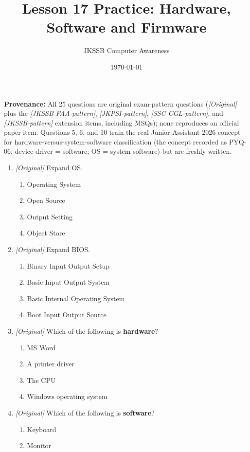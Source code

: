 \documentclass[11pt]{article}
\title{Lesson 17 Practice: Hardware, Software and Firmware}
\author{JKSSB Computer Awareness}
\date{\today}
\begin{document}
\maketitle
\noindent\textbf{Provenance:} All 25 questions are original exam-pattern questions (\textit{[Original]} plus the \textit{[JKSSB FAA-pattern]}, \textit{[JKPSI-pattern]}, \textit{[SSC CGL-pattern]}, and \textit{[JKSSB-pattern]} extension items, including MSQs); none reproduces an official paper item.
Questions 5, 6, and 10 train the real Junior Assistant 2026 concept for
hardware-versus-system-software classification (the concept recorded as PYQ-06,
device driver = software; OS = system software) but are freshly written.

\begin{enumerate}[label=\textbf{Q\arabic*.}, leftmargin=*]
\item \textit{[Original]} Expand OS.
  \begin{enumerate}[label=\Alph*.]
    \item Operating System
    \item Open Source
    \item Output Setting
    \item Object Store
  \end{enumerate}
\item \textit{[Original]} Expand BIOS.
  \begin{enumerate}[label=\Alph*.]
    \item Binary Input Output Setup
    \item Basic Input Output System
    \item Basic Internal Operating System
    \item Boot Input Output Source
  \end{enumerate}
\item \textit{[Original]} Which of the following is \textbf{hardware}?
  \begin{enumerate}[label=\Alph*.]
    \item MS Word
    \item A printer driver
    \item The CPU
    \item Windows operating system
  \end{enumerate}
\item \textit{[Original]} Which of the following is \textbf{software}?
  \begin{enumerate}[label=\Alph*.]
    \item Keyboard
    \item Monitor

\end{enumerate}
\end{enumerate}
\end{document}
